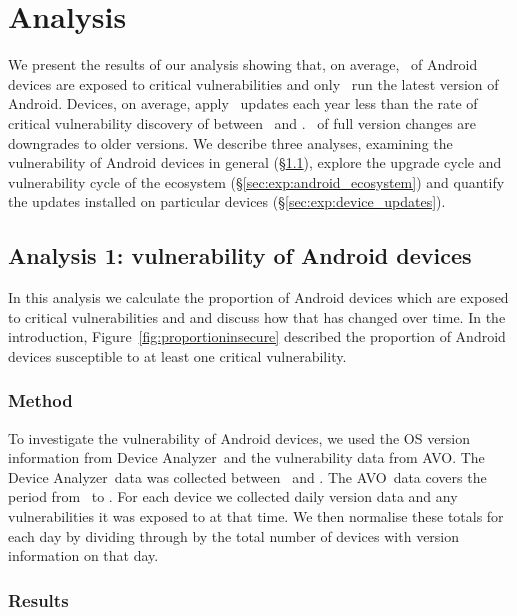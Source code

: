 \documentclass{llncs}
\newcommand{\da}{Device Analyzer}
\newcommand{\avo}{AVO}
\begin{document}
\section{Analysis}
\label{sec:results}
We present the results of our analysis showing that, on average, \daMeanInsecurityPerc\ of Android devices are exposed to critical vulnerabilities and only \daUpdatednessPerc\ run the latest version of Android.
Devices, on average, apply \daUpdatesPerYear\ updates each year less than the rate of critical vulnerability discovery of between \avoVulnsPerYearAllAndroid\ and \avoVulnsPerYear.
\daPercUpdatesDowngrades\ of full version changes are downgrades to older versions.
We describe three analyses, examining the vulnerability of Android devices in general (\S\ref{sec:exp:versionsecurity}), explore the upgrade cycle and vulnerability cycle of the ecosystem (\S\ref{sec:exp:android_ecosystem}) and quantify the updates installed on particular devices (\S\ref{sec:exp:device_updates}).

\subsection{Analysis 1: vulnerability of Android devices}\label{sec:exp:versionsecurity}
In this analysis we calculate the proportion of Android devices which are exposed to critical vulnerabilities and and discuss how that has changed over time.
In the introduction, Figure~\ref{fig:proportioninsecure} described the proportion of Android devices susceptible to at least one critical vulnerability.

\subsubsection{Method} 
To investigate the vulnerability of Android devices, we used the OS version information from \da\ and the vulnerability data from \avo.
The \da\ data was collected between \daStartDate\ and \daEndDate.
The \avo\ data covers the period from \avoFirstDataDate\ to \avoLastDataDate.
For each device we collected daily version data and any vulnerabilities it was exposed to at that time.
We then normalise these totals for each day by dividing through by the total number of devices with version information on that day.

\subsubsection{Results}
\end{document}
